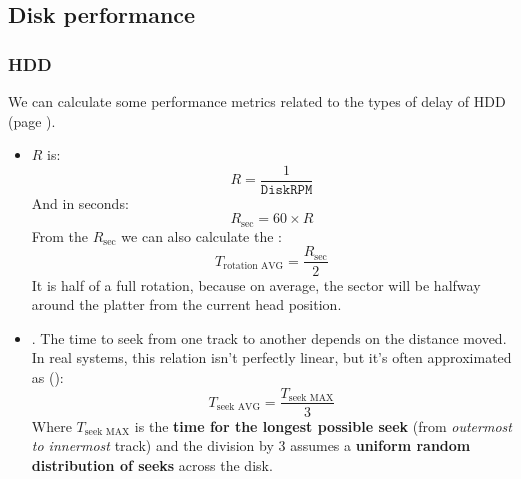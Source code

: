 \subsection{Disk performance}\label{subsection: Disk performance}

\subsubsection{HDD}\label{subsubsection: HDD performance}

We can calculate some performance metrics related to the types of delay of HDD (page \pageref{four types of hdd delay}).
\begin{itemize}
    \item {} $R$ is:
    \begin{equation}
        R = \dfrac{1}{\texttt{DiskRPM}}
    \end{equation}
    And in seconds:
    \begin{equation}
        R_{\text{sec}} = 60 \times R
    \end{equation}
    From the $R_{\text{sec}}$ we can also calculate the :
    \begin{equation}
        T_{\text{rotation AVG}} = \dfrac{R_{\text{sec}}}{2}
    \end{equation}
    It is half of a full rotation, because on average, the sector will be halfway around the platter from the current head position.

    \item {}. The time to seek from one track to another depends on the distance moved. In real systems, this relation isn't perfectly linear, but it's often approximated as ():
    \begin{equation}
        T_{\text{seek AVG}} = \dfrac{T_{\text{seek MAX}}}{3}
    \end{equation}
    Where $T_{\text{seek MAX}}$ is the \textbf{time for the longest possible seek} (from \emph{outermost to innermost} track) and the division by 3 assumes a \textbf{uniform random distribution of seeks} across the disk.


\end{itemize}
